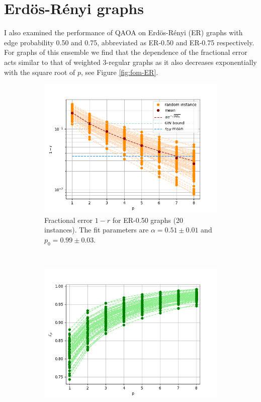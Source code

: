 \section{Erd\"os-R\'enyi graphs}
I also examined the performance of QAOA on Erd\"os-R\'enyi (ER) graphs with edge probability 0.50 and 0.75, abbreviated as ER-0.50 and ER-0.75 respectively. For graphs of this ensemble we find that the dependence of the fractional error acts similar to that of weighted 3-regular graphs as it also decreases exponentially with the square root of $p$, see Figure \ref{fig:fom-ER}.

\begin{figure}[H]
	\centering
	\begin{subfigure}[t]{0.48\textwidth}
		\centering
		\includegraphics[width=\textwidth]{figures/interp/fom_er050.png}
		\caption{Fractional error $1-r$ for ER-0.50 graphs (20 instances). The fit parameters are $\alpha = 0.51 \pm 0.01$ and $p_0 = 0.99 \pm 0.03$.}
	\end{subfigure}%
	~
	\begin{subfigure}[t]{0.48\textwidth}
		\centering
		\includegraphics[width=\textwidth]{figures/interp/r_er050.png}

\end{subfigure}
\end{figure}
